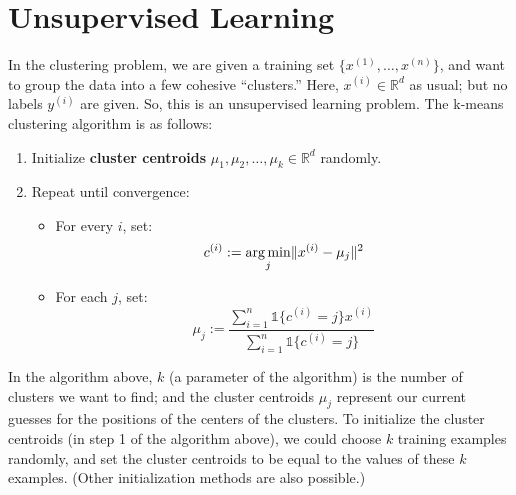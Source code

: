 \titlespacing*{\part}{0pt}{-20pt}{30pt} %
\titlespacing*{\chapter}{0pt}{-10pt}{30pt}

\part{Unsupervised Learning}
\label{part:unsupervised_learning}


\vspace{1cm}
\label{cha:k_means}
In the clustering problem, we are given a training set $\{x^{(1)} ,\ldots,x^{(n)}\}$, and
want to group the data into a few cohesive ``clusters.'' Here, $x^{(i)} \in \mathbb R^d$
as usual; but no labels $y^{(i)}$ are given. So, this is an unsupervised learning
problem.
The k-means clustering algorithm is as follows:
\begin{enumerate}
    \item Initialize \textbf{cluster centroids} $\mu_1 ,\mu_2 ,\ldots,\mu_k \in \mathbb R^d$ randomly.
    \item Repeat until convergence:
    \begin{itemize}
        \item For every $i$, set:
        \begin{equation*}
            c^{(i)} := \argmin_j \lVert x^{(i)} - \mu_j \rVert^2
        \end{equation*}
        \item For each $j$, set:
        \begin{equation*}
            \mu_j := \frac{\sum^n_{i=1} \mathbb{1}\{c^{(i)} = j\}x^{(i)}}{\sum^n_{i=1} \mathbb{1}\{c^{(i)} = j\}}
        \end{equation*}
    \end{itemize}
\end{enumerate}

In the algorithm above, $k$ (a parameter of the algorithm) is the number
of clusters we want to find; and the cluster centroids $\mu_j$ represent our current
guesses for the positions of the centers of the clusters. To initialize the cluster
centroids (in step 1 of the algorithm above), we could choose $k$ training
examples randomly, and set the cluster centroids to be equal to the values of
these $k$ examples. (Other initialization methods are also possible.)

